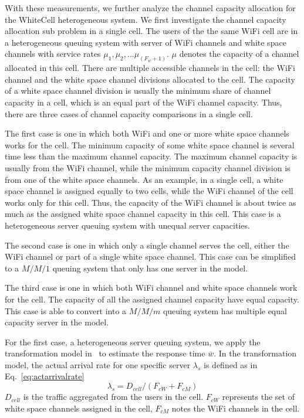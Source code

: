 With these measurements, we further analyze the channel capacity allocation for 
the WhiteCell heterogeneous system. 
We first investigate the channel capacity allocation sub problem in a single cell.
The users of the the same WiFi cell are in a heterogeneous queuing system with server of 
WiFi channels and white space channels with service rates $\mu_1,\mu_2,...\mu_{(F_w+1)}$.
$\mu$ denotes the capacity of a channel allocated in this cell.
There are multiple accessible channels in the cell: the WiFi channel and the 
white space channel divisions allocated to the cell.
The capacity of a white space channel division is usually 
the minimum share of channel capacity in a cell, which is an equal part of the WiFi channel capacity.
Thus, there are three cases of channel capacity comparisons in a single cell. 

The first case is one in which both WiFi and one or more white space channels works for the cell. 
The minimum capacity of some white space channel is several time less than the maximum channel 
capacity. The maximum channel capacity is usually from the WiFi channel, while the minimum capacity channel 
division is from one of the white space channels. 
As an example, in a single cell, a white space channel is assigned equally to two cells, while 
the WiFi channel of the cell works only for this cell. Thus, the capacity of the WiFi channel is 
about twice as much as the assigned white space channel capacity in this cell.
This case is a heterogeneous server queuing system with unequal server capacities.

The second case is one in which only a single channel serves the cell, either the WiFi channel or 
part of a single white space channel.
This case can be simplified to a $M/M/1$ queuing system that only has one server in the model.

The third case is one in which both WiFi channel and white space channels work for the cell. 
The capacity of all the assigned channel capacity have equal capacity.
This case is able to convert into a $M/M/m$ queuing system has multiple equal capacity server in the model.

For the first case, a heterogeneous server queuing system, we apply the transformation model 
in~\cite{yu2008transformation} to estimate the response time $\bar{w}$. 
In the transformation model, the actual arrival rate for one specific server $\lambda_s$ is 
defined as in Eq.~\ref{eq:actarrivalrate}
\begin{equation}
\label{eq:actarrivalrate}
\lambda_s=D_{cell}/(F_{cW}+F_{cM})
\end{equation}
$D_{cell}$ is the traffic aggregated from the users in the cell.
$F_{cW}$ represents the set of white space channels assigned in the cell, $F_{cM}$ notes the WiFi channels 
in the cell.


